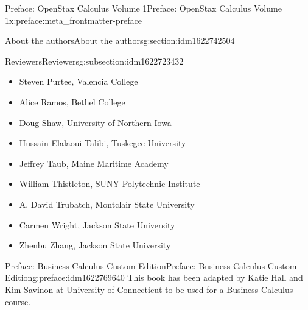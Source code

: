 \documentclass[oneside,10pt,]{book}
\numberwithin{equation}{section}
\begin{document}
\begin{preface}{Preface: OpenStax Calculus Volume 1}{}{Preface: OpenStax Calculus Volume 1}{}{}{x:preface:meta_frontmatter-preface}
\begin{sectionptx}{About the authors}{}{About the authors}{}{}{g:section:idm1622742504}
\begin{subsectionptx}{Reviewers}{}{Reviewers}{}{}{g:subsection:idm1622723432}
\begin{itemize}[label=\textbullet]
\item{}Steven Purtee, Valencia College%
\item{}Alice Ramos, Bethel College%
\item{}Doug Shaw, University of Northern Iowa%
\item{}Hussain Elalaoui-Talibi, Tuskegee University%
\item{}Jeffrey Taub, Maine Maritime Academy%
\item{}William Thistleton, SUNY Polytechnic Institute%
\item{}A. David Trubatch, Montclair State University%
\item{}Carmen Wright, Jackson State University%
\item{}Zhenbu Zhang, Jackson State University%
\end{itemize}
%
\end{subsectionptx}
\end{sectionptx}
\end{preface}
%
%
\typeout{************************************************}
\typeout{************************************************}
%
\begin{preface}{Preface: Business Calculus Custom Edition}{}{Preface: Business Calculus Custom Edition}{}{}{g:preface:idm1622769640}
This book has been adapted by Katie Hall and Kim Savinon at University of Connecticut to be used for a Business Calculus course.%
\end{preface}
\setcounter{tocdepth}{1}
\renewcommand*\contentsname{Contents}
\tableofcontents
\mainmatter
%
%
\typeout{************************************************}
\typeout{************************************************}
%
\end{document}
